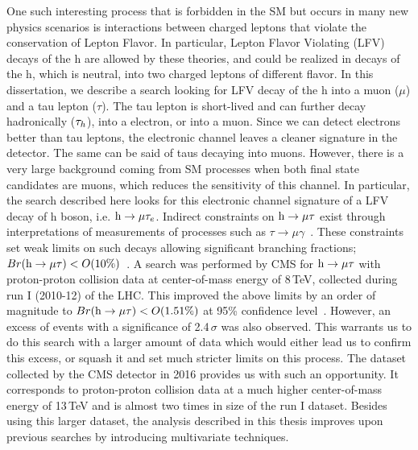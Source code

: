 One such interesting process that is forbidden in the SM but occurs in many new physics scenarios is interactions between charged leptons that violate the conservation of Lepton Flavor. In particular, Lepton Flavor Violating (LFV) decays of the h are allowed by these theories, and could be realized in decays of the h, which is neutral, into two charged leptons of different flavor. In this dissertation, we describe a search looking for LFV decay of the h into a muon ($\mu$) and a tau lepton ($\tau$). The tau lepton is short-lived and can further decay hadronically ($\tau_{h}$), into a electron, or into a muon. Since we can detect electrons better than tau leptons, the electronic channel leaves a cleaner signature in the detector. The same can be said of taus decaying into muons. However, there is a very large background coming from SM processes when both final state candidates are muons, which reduces the sensitivity of this channel. In particular, the search described here looks for this electronic channel signature of a LFV decay of h boson, i.e. $\text{h} \to \mu \tau_{e}$. Indirect constraints on $\text{h} \to \mu \tau$ exist through interpretations of measurements of processes such as $\tau \rightarrow \mu \gamma$~\cite{kanemura}. These constraints set weak limits on such decays allowing significant branching fractions; $Br(\text{h} \to \mu \tau)<O(10\%)$~\cite{Blankenburg:2012ex,Harnik:2012pb}. A search was performed by CMS for $\text{h} \to \mu \tau$ with proton-proton collision data at center-of-mass energy of 8\,TeV, collected during run I (2010-12) of the LHC. This improved the above limits by an order of magnitude to $Br(\text{h} \to \mu \tau)<O(1.51\%)$ at 95\% confidence level~\cite{Khachatryan:2015kon}. However, an excess of events with a significance of 2.4\,$\sigma$ was also observed. This warrants us to do this search with a larger amount of data which would either lead us to confirm this excess, or squash it and set much stricter limits on this process. The dataset collected by the CMS detector in 2016 provides us with such an opportunity. It corresponds to proton-proton collision data at a much higher center-of-mass energy of 13\,TeV and is almost two times in size of the run I dataset. Besides using this larger dataset, the analysis described in this thesis improves upon previous searches by introducing multivariate techniques.


